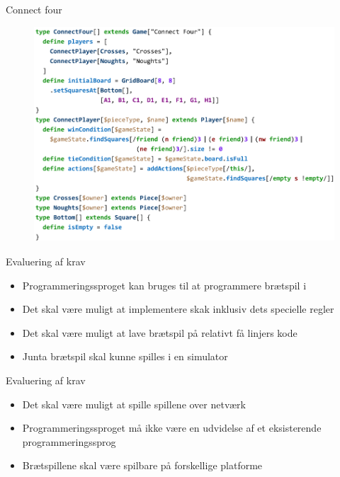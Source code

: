 \begin{frame}{Connect four}
 	\begin{figure}
    	\includegraphics[width=0.8\linewidth]{billeder/connect4_codeexample.png}
 	\end{figure}
\end{frame}

\begin{frame}{Evaluering af krav}
	\begin{itemize}
		\item Programmeringssproget kan bruges til at programmere brætspil i
		\item Det skal være muligt at implementere skak inklusiv dets specielle regler
		\item Det skal være muligt at lave brætspil på relativt få linjers kode
		\item Junta brætspil skal kunne spilles i en simulator
	\end{itemize}	
\end{frame}

\begin{frame}{Evaluering af krav}
	\begin{itemize}
		\item Det skal være muligt at spille spillene over netværk
		\item Programmeringssproget må ikke være en udvidelse af et eksisterende programmeringssprog 
		\item Brætspillene skal være spilbare på forskellige platforme
	\end{itemize}	
\end{frame}

